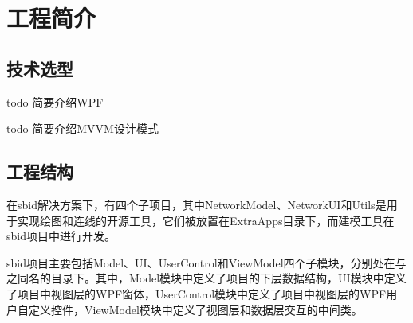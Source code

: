 \chapter{工程简介}

\section{技术选型}
todo 简要介绍WPF
\par
todo 简要介绍MVVM设计模式

\section{工程结构}
在sbid解决方案下，有四个子项目，其中NetworkModel、NetworkUI和Utils是用于实现绘图和连线的开源工具，它们被放置在ExtraApps目录下，而建模工具在sbid项目中进行开发。
\par
sbid项目主要包括Model、UI、UserControl和ViewModel四个子模块，分别处在与之同名的目录下。其中，Model模块中定义了项目的下层数据结构，UI模块中定义了项目中视图层的WPF窗体，UserControl模块中定义了项目中视图层的WPF用户自定义控件，ViewModel模块中定义了视图层和数据层交互的中间类。
